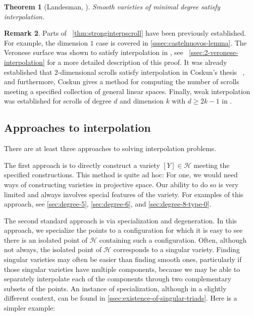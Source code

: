 \documentclass[reqno, 11pt]{amsart}
\theoremstyle{definition}
\theoremstyle{remark}
\numberwithin{equation}{section}
\numberwithin{thm}{section}
\numberwithin{prop}{section}
\numberwithin{lem}{section}
\numberwithin{cor}{section}
\numberwithin{conj}{section}
\numberwithin{defn}{section}
\theoremstyle{plain}
\newtheorem{theorem}{Theorem}[section]
\theoremstyle{definition}
\newtheorem{remark}[theorem]{Remark}
\newcommand\sch{\mathscr H}
\begin{document}
\begin{theorem}[Landesman, \cite{landesman:interpolation-of-varieties-of-minimal-degree}]\label{thm:stronginterpscroll}
Smooth varieties of minimal degree satisfy interpolation.
\end{theorem}
\begin{remark}
	\label{remark:}
	Parts of ~\autoref{thm:stronginterpscroll}
	have been previously established. For example,
	the dimension $1$ case is covered in \ref{sssec:castelnuovos-lemma}.
	The Veronese surface was shown to satisfy interpolation
	in \cite[Theorem 19]{coble:associated-sets-of-points},
	see ~\autoref{ssec:2-veronese-interpolation}
	for a more detailed description of this proof.
	It was already established that $2$-dimensional
	scrolls satisfy interpolation in
	Coskun's thesis ~\cite[Example, p.\ 2]{coskun:degenerations-of-surface-scrolls}, and furthermore,
	Coskun gives a method for computing the number of scrolls
	meeting a specified collection of general linear spaces.
	Finally, weak interpolation was established for
	scrolls of degree $d$ and dimension $k$ with
	$d \geq 2k - 1$ in \cite[Theorem 4.5]{eisenbudP:the-projective-geometry-of-the-gale-transform}.
\end{remark}

\subsection{Approaches to interpolation}
There are at least three approaches to solving interpolation problems.  

The first approach is to directly construct a variety $[Y] \in \sch$ meeting the specified constructions.  This method is quite ad hoc: For one, we would need ways of constructing varieties in projective space.  Our ability to do so is very limited and always involves special features of the variety. For examples of this approach, see
\autoref{sec:degree-5}, \autoref{sec:degree-6}, and \autoref{sec:degree-8-type-0}.


The second standard approach is via specialization
and degeneration. In this approach,
we specialize the points to a configuration
for which it is easy to see there is an isolated point
of $\sch$ containing such a configuration.
Often, although not always, the isolated point of $\sch$
corresponds to
a singular variety.
Finding singular varieties may often be easier than
finding smooth ones, particularly if those singular
varieties have multiple components, because we may
be able to separately interpolate each of the components
through two complementary subsets of the points.
An instance of specialization, although in a slightly different context, can be found in
\autoref{ssec:existence-of-singular-triads}. Here is
a simpler example:
\end{document}
